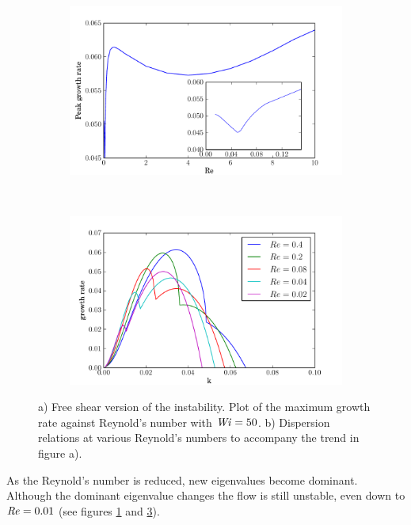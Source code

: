 \documentclass{jfm}
\newcommand\Wi{\mbox{\textit{Wi}}}
\newcommand\Rey{\mbox{\textit{Re}}}  %
\begin{document}
\begin{figure}
    \centering
    \begin{subfigure}[b]{0.48\textwidth}
	\centering
	\includegraphics[width=\textwidth]{inf_vary_Re}
	\caption{}
	\label{fig:inf_vary_Re}
    \end{subfigure}
    ~
    \begin{subfigure}[b]{0.48\textwidth}
	\centering
	\includegraphics[width=\textwidth]{inf_dispersions_low_Wi}
	\caption{}
	\label{fig:dispersions_low_Wi}
    \end{subfigure}
    \caption{
	a) Free shear version of the instability. Plot of the maximum growth
	rate against Reynold's number with $\Wi=50$. b) Dispersion relations at
	various Reynold's numbers to accompany the trend in figure a).
    } 
    \end{figure}

As the Reynold's number is reduced, new eigenvalues become dominant. Although
the dominant eigenvalue changes the flow is still unstable, even down to $\Rey
= 0.01$ (see figures \ref{fig:inf_vary_Re} and \ref{fig:dispersions_low_Wi}).
\end{document}
